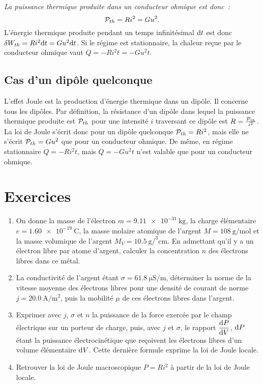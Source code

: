 \emph{La puissance thermique produite dans un conducteur ohmique est donc~:}
\begin{equation}\label{eq:loidejoule}
\P_{th} = Ri^2=Gu^2.
\end{equation}
L'énergie thermique produite pendant un temps infinitésimal \(\D t\) est donc \(\delta W_{th} = Ri^2 \D t = Gu^2 \D t\). Si le régime est stationnaire, la chaleur reçue par le conducteur ohmique vaut \(Q = -Ri^2 t = -Gu^2 t\).

\subsection{Cas d'un dipôle quelconque}

L'effet Joule est la production d'énergie thermique dans un dipôle. Il concerne tous les dipôles. Par définition, la résistance d'un dipôle dans lequel la puissance thermique produite est \(\P_{th}\) pour une intensité \(i\) traversant ce dipôle est \(R = \frac{\P_{th}}{i^2}\). La loi de Joule s'écrit donc pour un dipôle quelconque \(\P_{th} = Ri^2\), mais elle ne s'écrit \(\P_{th} = Gu^2\) que pour un conducteur ohmique. De même, en régime stationnaire \(Q = -Ri^2 t\), mais \(Q=-Gu^2t\) n'est valable que pour un conducteur ohmique.

\section{Exercices}
\begin{exercice}
	\begin{enumerate}
		\item On donne la masse de l'électron \(m=\SI{9.11e-31}{\kilogram}\), la charge élémentaire \(e = \SI{1.60e-19}{\coulomb}\), la masse molaire atomique de l'argent \(M=\SI{108}{\gram\per\mole}\) et la masse volumique de l'argent \(M_V = \SI{10.5}{\gram\per\cubed\centi\meter}\). En admettant qu'il y a un électron libre par atome d'argent, calculer la concentration \(n\) des électrons libres dans ce métal.
		\item La conductivité de l'argent étant \(\sigma = \SI{61.8}{\micro\siemens\per\meter}\), déterminer la norme de la vitesse moyenne des électrons libres pour une densité de courant de norme \(j=\SI{20.0}{\ampere\per\meter\squared}\), puis la mobilité \(\mu\) de ces électrons libres dans l'argent.
		\item Exprimer avec \(j\), \(\sigma\) et \(n\) la puissance de la force exercée par le champ électrique sur un porteur de charge, puis, avec \(j\) et \(\sigma\), le rapport \(\derived{P}{V}\), \(\D P\) étant la puissance électrocinétique que reçoivent les électrons libres d'un volume élémentaire \(\D V\). Cette dernière formule exprime la loi de Joule locale.
		\item Retrouver la loi de Joule macroscopique \(P=Ri^2\) à partir de la loi de Joule locale.
	\end{enumerate}
\end{exercice}

